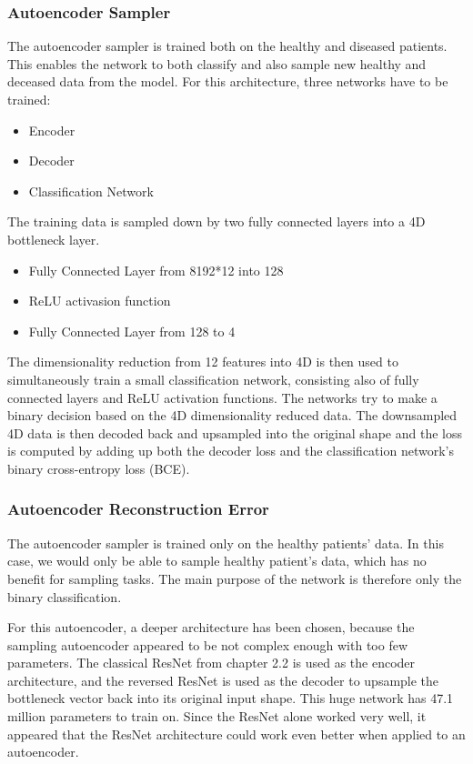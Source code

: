 \documentclass[journal]{IEEEtran}
\begin{document}
\subsubsection{Autoencoder Sampler}
The autoencoder sampler is trained both on the healthy and diseased patients. This enables the network to both classify and also sample new healthy and deceased data from the model. For this architecture, three networks have to be trained:

\begin{itemize}
\item Encoder
\item Decoder
\item Classification Network
\end{itemize}

The training data is sampled down by two fully connected layers into a 4D bottleneck layer. 

\begin{itemize}
\item Fully Connected Layer from 8192*12 into 128
\item ReLU activasion function
\item Fully Connected Layer from 128 to 4
\end{itemize}

The dimensionality reduction from 12 features into 4D is then used to simultaneously train a small classification network, consisting also of fully connected layers and ReLU activation functions. The networks try to make a binary decision based on the 4D dimensionality reduced data. The downsampled 4D data is then decoded back and upsampled into the original shape and the loss is computed by adding up both the decoder loss and the classification network's binary cross-entropy loss (BCE).

\subsubsection{Autoencoder Reconstruction Error}
The autoencoder sampler is trained only on the healthy patients' data. In this case, we would only be able to sample healthy patient's data, which has no benefit for sampling tasks. The main purpose of the network is therefore only the binary classification.

For this autoencoder, a deeper architecture has been chosen, because the sampling autoencoder appeared to be not complex enough with too few parameters. The classical ResNet from chapter 2.2 is used as the encoder architecture, and the reversed ResNet is used as the decoder to upsample the bottleneck vector back into its original input shape. This huge network has 47.1 million parameters to train on. Since the ResNet alone worked very well, it appeared that the ResNet architecture could work even better when applied to an autoencoder.
\end{document}
